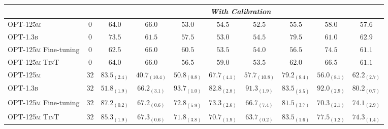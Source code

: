 \begin{table}[t]
{\begin{tabular}{lc|cccccccc}
\midrule
\multicolumn{2}{c}{} & \multicolumn{8}{c}{\textbf{\textit{With Calibration}}} \\ \midrule
\textsc{OPT-125m} & $0$ & $64.0$ & $66.0$ & $53.0$ & $54.5$ & $52.5$ & $55.5$ & $58.0$ & $57.6$ \\
\textsc{OPT-1.3b} & $0$ & $73.5$ & $61.5$ & $57.5$ & $53.0$ & $54.5$ & $79.5$ & $61.0$ & $62.9$ \\
\textsc{OPT-125m} Fine-tuning & $0$ & $62.5$ & $66.0$ & $60.5$ & $53.5$ & $54.0$ & $56.5$ & $74.5$ & $61.1$ \\
\rowcolor{gray!10}\textsc{OPT-125m TinT} & $0$ & $64.0$ & $66.0$ & $56.5$ & $59.0$ & $53.5$ & $62.0$ & $66.5$ & $61.1$ \\ \midrule
\textsc{OPT-125m} & $32$ & $83.5_{(2.4)}$ & $40.7_{(10.4)}$ & $50.8_{(0.8)}$ & $67.7_{(4.1)}$ & $57.7_{(10.8)}$ & $79.2_{(8.4)}$ & $56.0_{(8.1)}$ & $62.2_{(2.7)}$ \\
\textsc{OPT-1.3b} & $32$ & $51.8_{(1.9)}$ & $66.2_{(3.1)}$ & $93.7_{(1.0)}$ & $82.8_{(2.8)}$ & $91.3_{(1.9)}$ & $83.5_{(2.5)}$ & $92.0_{(2.9)}$ & $80.2_{(0.7)}$ \\ 
\textsc{OPT-125m} Fine-tuning & $32$ & $87.2_{(0.2)}$ & $67.2_{(0.6)}$ & $72.8_{(5.9)}$ & $73.3_{(2.6)}$ & $66.7_{(7.4)}$ & $81.5_{(3.7)}$ & $70.3_{(2.1)}$ & $74.1_{(2.9)}$ \\
\rowcolor{gray!10}\textsc{OPT-125m TinT} & $32$ & $85.3_{(1.9)}$ & $67.3_{(0.6)}$ & $71.8_{(3.8)}$ & $70.7_{(1.9)}$ & $63.7_{(0.2)}$ & $83.5_{(1.6)}$ & $77.5_{(1.2)}$ & $74.3_{(1.4)}$ \\ 
    \bottomrule
  \end{tabular}}
\end{table}

